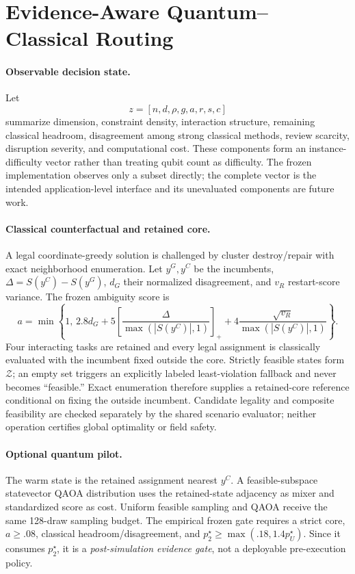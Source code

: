 \section{Evidence-Aware Quantum--Classical Routing}
\label{sec:routing}

\paragraph{Observable decision state.}
Let
\begin{equation}
z=[n,d,\rho,g,a,r,s,c]
\label{eq:state}
\end{equation}
summarize dimension, constraint density, interaction structure, remaining classical headroom, disagreement among strong classical methods, review scarcity, disruption severity, and computational cost. These components form an instance-difficulty vector rather than treating qubit count as difficulty. The frozen implementation observes only a subset directly; the complete vector is the intended application-level interface and its unevaluated components are future work.

\paragraph{Classical counterfactual and retained core.}
A legal coordinate-greedy solution is challenged by cluster destroy/repair with exact neighborhood enumeration. Let $y^G,y^C$ be the incumbents, $\Delta=S(y^C)-S(y^G)$, $d_G$ their normalized disagreement, and $v_R$ restart-score variance. The frozen ambiguity score is
\begin{equation}
a=\min\!\left\{1,\,2.8d_G+5\left[\frac{\Delta}{\max(|S(y^C)|,1)}\right]_+
+4\frac{\sqrt{v_R}}{\max(|S(y^C)|,1)}\right\}.
\label{eq:ambiguity}
\end{equation}
Four interacting tasks are retained and every legal assignment is classically evaluated with the incumbent fixed outside the core. Strictly feasible states form $\mathcal Z$; an empty set triggers an explicitly labeled least-violation fallback and never becomes ``feasible.'' Exact enumeration therefore supplies a retained-core reference conditional on fixing the outside incumbent. Candidate legality and composite feasibility are checked separately by the shared scenario evaluator; neither operation certifies global optimality or field safety.

\paragraph{Optional quantum pilot.}
The warm state is the retained assignment nearest $y^C$. A feasible-subspace statevector QAOA distribution uses the retained-state adjacency as mixer and standardized score as cost. Uniform feasible sampling and QAOA receive the same 128-draw sampling budget. The empirical frozen gate requires a strict core, $a\ge .08$, classical headroom/disagreement, and $p_2^\star\ge\max(.18,1.4p_U^\star)$. Since it consumes $p_2^\star$, it is a \emph{post-simulation evidence gate}, not a deployable pre-execution policy.


